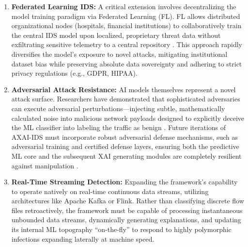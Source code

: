\documentclass[conference]{IEEEtran}
\begin{document}
\begin{enumerate}
\item \textbf{Federated Learning IDS:} A critical extension involves decentralizing the model training paradigm via Federated Learning (FL). FL allows distributed organizational nodes (hospitals, financial institutions) to collaboratively train the central IDS model upon localized, proprietary threat data without exfiltrating sensitive telemetry to a central repository \cite{ribeiro2016should}. This approach rapidly diversifies the model's exposure to novel attacks, mitigating institutional dataset bias while preserving absolute data sovereignty and adhering to strict privacy regulations (e.g., GDPR, HIPAA).
\item \textbf{Adversarial Attack Resistance:} AI models themselves represent a novel attack surface. Researchers have demonstrated that sophisticated adversaries can execute adversarial perturbations—injecting subtle, mathematically calculated noise into malicious network payloads designed to explicitly deceive the ML classifier into labeling the traffic as benign \cite{stafford2020zero}. Future iterations of AXAI-IDS must incorporate robust adversarial defense mechanisms, such as adversarial training and certified defense layers, ensuring both the predictive ML core and the subsequent XAI generating modules are completely resilient against manipulation \cite{sharafaldin2018toward}.
\item \textbf{Real-Time Streaming Detection:} Expanding the framework’s capability to operate natively on real-time continuous data streams, utilizing architectures like Apache Kafka or Flink. Rather than classifying discrete flow files retroactively, the framework must be capable of processing instantaneous unbounded data streams, dynamically generating explanations, and updating its internal ML topography “on-the-fly” to respond to highly polymorphic infections expanding laterally at machine speed.
\end{enumerate}





\end{document}
